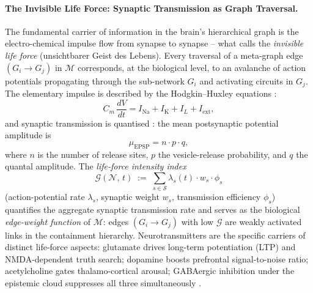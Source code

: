 ﻿\documentclass[12pt,a4paper]{article}
\theoremstyle{plain}
\theoremstyle{definition}
\theoremstyle{remark}
\begin{document}
	\paragraph{The Invisible Life Force: Synaptic Transmission as Graph
		Traversal.}
	The fundamental carrier of information in the brain's hierarchical graph is
	the electro-chemical impulse flow from synapse to synapse -- what
	\cite{epp2026brain} calls the \emph{invisible life force} (unsichtbarer Geist
	des Lebens).  Every traversal of a meta-graph edge $(G_i \to G_j)$ in
	$\mathcal{M}$ corresponds, at the biological level, to an avalanche of action
	potentials propagating through the sub-network $G_i$ and activating circuits
	in $G_j$.  The elementary impulse is described by the Hodgkin--Huxley
	equations \cite{hodgkin1952}:
	\[
	C_m\,\frac{dV}{dt} = I_{\mathrm{Na}} + I_{\mathrm{K}} + I_L + I_{\mathrm{ext}},
	\]
	and synaptic transmission is quantised \cite{delcastillo1954}: the mean
	postsynaptic potential amplitude is
	\[
	\mu_{\mathrm{EPSP}} = n \cdot p \cdot q,
	\]
	where $n$ is the number of release sites, $p$ the vesicle-release
	probability, and $q$ the quantal amplitude.  The \emph{life-force intensity
		index} \cite{epp2026brain}
	\[
	\mathcal{G}(\mathcal{N},\,t) \;:=\;
	\sum_{s \in \mathcal{S}} \lambda_s(t)\cdot w_s \cdot \phi_s
	\]
	(action-potential rate $\lambda_s$, synaptic weight $w_s$, transmission
	efficiency $\phi_s$) quantifies the aggregate synaptic transmission rate and
	serves as the biological \emph{edge-weight function} of $\mathcal{M}$: edges
	$(G_i \to G_j)$ with low $\mathcal{G}$ are weakly activated links in the
	containment hierarchy.  Neurotransmitters are the specific carriers of
	distinct life-force aspects: glutamate drives long-term potentiation (LTP)
	and NMDA-dependent truth search; dopamine boosts prefrontal signal-to-noise
	ratio; acetylcholine gates thalamo-cortical arousal; GABAergic
	inhibition under the epistemic cloud suppresses all three simultaneously
	\cite{epp2026brain}.
	
\end{document}
